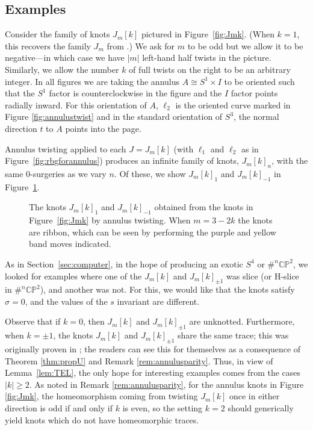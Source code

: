 \documentclass [11pt]{amsart}
\theoremstyle{remark}
\def\CP{\mathbb{CP}^2}
\begin{document}
\subsection{Examples}
Consider the family of knots $J_m[k]$ pictured in Figure~\ref{fig:Jmk}. (When $k=1$, this recovers the family $J_m$ from \cite[Figure 4]{AJOT}.) We ask for $m$ to be odd but we allow it to be negative---in which case we have $|m|$ left-hand half twists in the picture. Similarly, we allow the number $k$ of full twists on the right to be an arbitrary integer. In all figures we are taking the annulus $A\cong S^1\times I$ to be oriented such that the $S^1$ factor is counterclockwise in the figure and the $I$ factor points radially inward. For this orientation of $A$, $\ell_2$ is the oriented curve marked in Figure \ref{fig:annulustwist} and in the standard orientation of $S^3$, the normal direction $t$ to $A$ points into the page. 


Annulus twisting applied to each $J=J_m[k]$ (with $\ell_1$ and $\ell_2$ as in Figure~\ref{fig:rbgforannulus}) produces an infinite family of knots, $J_m[k]_n$, with the same $0$-surgeries as we vary $n$. Of these, we show $J_m[k]_{1}$ and $J_m[k]_{-1}$ in Figure~\ref{fig:Jmktw}.

\begin{figure}
{
   \fontsize{10pt}{12pt}\selectfont
   \def\svgwidth{5in}
   
}
\caption{The knots $J_m[k]_{1}$ and $J_m[k]_{-1}$  obtained from the knots in Figure~\ref{fig:Jmk} by annulus twisting. When $m=3-2k$ the knots are ribbon, which can be seen by performing the purple and yellow band moves indicated.
}
\label{fig:Jmktw}
\end{figure}


As in Section~\ref{sec:computer}, in the hope of producing an exotic $S^4$ or $\#^n \CP$, we looked for examples where one of the $J_m[k]$ and $J_m[k]_{\pm 1}$ was slice (or H-slice in $\#^n \CP$), and another was not. For this, we would like that the knots satisfy $\sigma=0$, and the values of the $s$ invariant are different. 

Observe that if $k=0$, then $J_m[k]$ and $J_m[k]_{\pm 1}$ are unknotted. Furthermore, when $k=\pm 1$, the knots $J_m[k]$ and $J_m[k]_{\pm 1}$ share the same trace; this was originally proven in \cite[Theorem 2.8]{AJOT}; the readers can see this for themselves as a consequence of Theorem \ref{thm:propU} and Remark  \ref{rem:annulusparity}. Thus, in view of Lemma~\ref{lem:TEL}, the only hope for interesting examples comes from the cases $|k| \geq 2$. As noted in Remark \ref{rem:annulusparity}, for the annulus knots in Figure \ref{fig:Jmk}, the homeomorphism coming from twisting $J_m[k]$ once in either direction is odd if and only if $k$ is even, so the setting $k=2$ should generically yield knots which do not have homeomorphic traces. 
\end{document}
